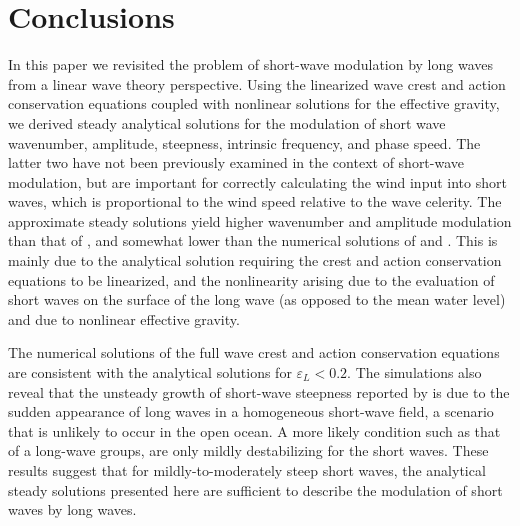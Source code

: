 \documentclass[lineno]{jfm}
\begin{document}
\section{Conclusions}
\label{section:conclusions}

In this paper we revisited the problem of short-wave modulation by long waves
from a linear wave theory perspective.
Using the linearized wave crest and action conservation equations coupled with nonlinear solutions for the effective gravity, we derived steady analytical solutions for the modulation
of short wave wavenumber, amplitude, steepness, intrinsic frequency, and phase
speed.
The latter two have not been previously examined in the context of short-wave
modulation, but are important for correctly calculating the wind input into
short waves, which is proportional to the wind speed relative to the wave
celerity.
The approximate steady solutions yield higher wavenumber and amplitude
modulation than that of \citet{longuet1960changes}, and somewhat lower than 
the numerical solutions of \citet{longuet1987propagation} and
\citet{zhang1990evolution}.
This is mainly due to the analytical solution requiring the crest and action
conservation equations to be linearized, and the nonlinearity arising due
to the evaluation of short waves on the surface of the long wave (as opposed to
the mean water level) and due to nonlinear effective gravity.

The numerical solutions of the full wave crest and action conservation equations
are consistent with the analytical solutions for $\varepsilon_L < 0.2$.
The simulations also reveal that the unsteady growth of short-wave steepness
reported by \citet{peureux2021unsteady} is due to the sudden appearance of
long waves in a homogeneous short-wave field, a scenario that is unlikely to
occur in the open ocean.
A more likely condition such as that of a long-wave groups, are only mildly
destabilizing for the short waves.
These results suggest that for mildly-to-moderately steep short waves,
the analytical steady solutions presented here are sufficient to describe the
modulation of short waves by long waves.



\end{document}
